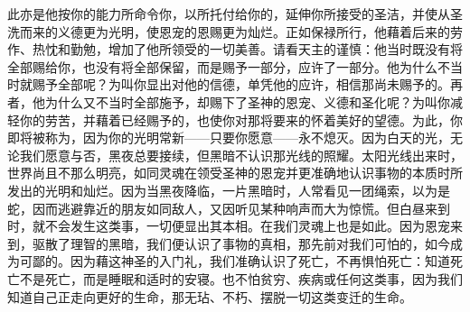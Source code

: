 此亦是他按你的能力所命令你，以所托付给你的，延伸你所接受的圣洁，并使从圣洗而来的义德更为光明，使恩宠的恩赐更为灿烂。正如保禄所行，他藉着后来的劳作、热忱和勤勉，增加了他所领受的一切美善。请看天主的谨慎：他当时既没有将全部赐给你，也没有将全部保留，而是赐予一部分，应许了一部分。他为什么不当时就赐予全部呢？为叫你显出对他的信德，单凭他的应许，相信那尚未赐予的。再者，他为什么又不当时全部施予，却赐下了圣神的恩宠、义德和圣化呢？为叫你减轻你的劳苦，并藉着已经赐予的，也使你对那将要来的怀着美好的望德。为此，你即将被称为，因为你的光明常新——只要你愿意——永不熄灭。因为白天的光，无论我们愿意与否，黑夜总要接续，但黑暗不认识那光线的照耀。太阳光线出来时，世界尚且不那么明亮，如同灵魂在领受圣神的恩宠并更准确地认识事物的本质时所发出的光明和灿烂。因为当黑夜降临，一片黑暗时，人常看见一团绳索，以为是蛇，因而逃避靠近的朋友如同敌人，又因听见某种响声而大为惊慌。但白昼来到时，就不会发生这类事，一切便显出其本相。在我们灵魂上也是如此。因为恩宠来到，驱散了理智的黑暗，我们便认识了事物的真相，那先前对我们可怕的，如今成为可鄙的。因为藉这神圣的入门礼，我们准确认识了死亡，不再惧怕死亡：知道死亡不是死亡，而是睡眠和适时的安寝。也不怕贫穷、疾病或任何这类事，因为我们知道自己正走向更好的生命，那无玷、不朽、摆脱一切这类变迁的生命。\par


